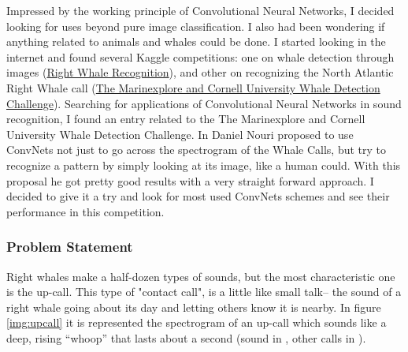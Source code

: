 \documentclass[]{article}
\newcommand{\competition}{The Marinexplore and Cornell University Whale Detection Challenge}
\begin{document}
Impressed by the working principle of Convolutional Neural Networks, I decided looking for uses beyond pure image classification. I also had been wondering if anything related to animals and whales could be done. I started looking in the internet and found several Kaggle competitions: one on whale detection through images (\href{https://www.kaggle.com/c/noaa-right-whale-recognition}{Right Whale Recognition}), and other on recognizing the North Atlantic Right Whale call (\href{https://www.kaggle.com/c/whale-detection-challenge}{\competition}). Searching for applications of Convolutional Neural Networks in sound recognition, I found an entry related to the \competition. In \cite{Nouriblog} Daniel Nouri proposed to use ConvNets not just to go across the spectrogram of the Whale Calls, but try to recognize a pattern by simply looking at its image, like a human could. With this proposal he got pretty good results with a very straight forward approach. I decided to give it a try and look for most used ConvNets schemes and see their performance in this competition.


\subsubsection{Problem Statement}\label{problem-statement}

Right whales make a half-dozen types of sounds, but the most characteristic one is the up-call. This type of "contact call",  is a little like small talk-- the sound of a right whale going about its day and letting others know it is nearby. In figure \ref{img:upcall} it is represented the spectrogram of an up-call which sounds like a deep, rising “whoop” that lasts about a second (sound in \cite{CornellWeb}, other calls in \cite{CornellWeb2}).
\end{document}
